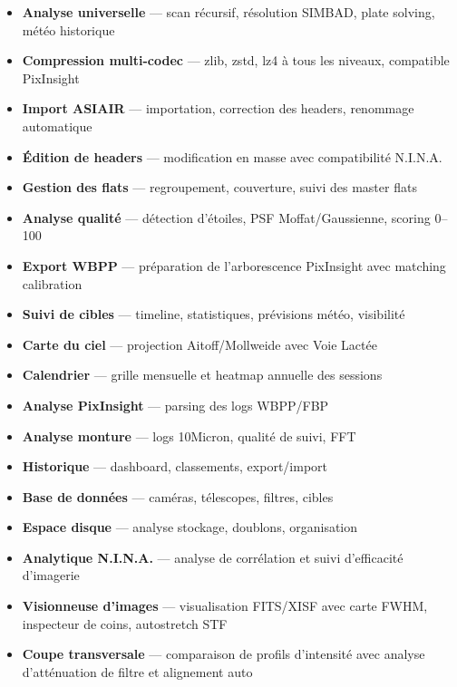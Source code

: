 \documentclass[a4paper,11pt]{article}
\begin{document}
\begin{itemize}
    \item \textbf{Analyse universelle} --- scan r\'{e}cursif, r\'{e}solution SIMBAD, plate solving, m\'{e}t\'{e}o historique
    \item \textbf{Compression multi-codec} --- zlib, zstd, lz4 \`{a} tous les niveaux, compatible PixInsight
    \item \textbf{Import ASIAIR} --- importation, correction des headers, renommage automatique
    \item \textbf{\'{E}dition de headers} --- modification en masse avec compatibilit\'{e} N.I.N.A.
    \item \textbf{Gestion des flats} --- regroupement, couverture, suivi des master flats
    \item \textbf{Analyse qualit\'{e}} --- d\'{e}tection d'\'{e}toiles, PSF Moffat/Gaussienne, scoring 0--100
    \item \textbf{Export WBPP} --- pr\'{e}paration de l'arborescence PixInsight avec matching calibration
    \item \textbf{Suivi de cibles} --- timeline, statistiques, pr\'{e}visions m\'{e}t\'{e}o, visibilit\'{e}
    \item \textbf{Carte du ciel} --- projection Aitoff/Mollweide avec Voie Lact\'{e}e
    \item \textbf{Calendrier} --- grille mensuelle et heatmap annuelle des sessions
    \item \textbf{Analyse PixInsight} --- parsing des logs WBPP/FBP
    \item \textbf{Analyse monture} --- logs 10Micron, qualit\'{e} de suivi, FFT
    \item \textbf{Historique} --- dashboard, classements, export/import
    \item \textbf{Base de donn\'{e}es} --- cam\'{e}ras, t\'{e}lescopes, filtres, cibles
    \item \textbf{Espace disque} --- analyse stockage, doublons, organisation
    \item \textbf{Analytique N.I.N.A.} --- analyse de corr\'{e}lation et suivi d'efficacit\'{e} d'imagerie
    \item \textbf{Visionneuse d'images} --- visualisation FITS/XISF avec carte FWHM, inspecteur de coins, autostretch STF
    \item \textbf{Coupe transversale} --- comparaison de profils d'intensit\'{e} avec analyse d'att\'{e}nuation de filtre et alignement auto
\end{itemize}
\end{document}
